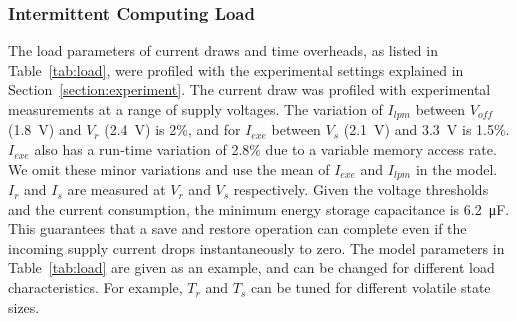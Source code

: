 
\subsubsection{Intermittent Computing Load} \label{ssubsec:loadconfig}

The load parameters of current draws and time overheads, as listed in Table~\ref{tab:load}, were profiled with the experimental settings explained in Section~\ref{section:experiment}. 
The current draw was profiled with experimental measurements at a range of supply voltages. The variation of $I_{lpm}$ between $V_{off}$ (\SI{1.8}{\volt}) and $V_{r}$ (\SI{2.4}{\volt}) is 2\%, and for $I_{exe}$ between $V_{s}$ (\SI{2.1}{\volt}) and \SI{3.3}{\volt} is 1.5\%. $I_{exe}$ also has a run-time variation of 2.8\% due to a variable memory access rate. We omit these minor variations and use the mean of $I_{exe}$ and $I_{lpm}$ in the model. $I_{r}$ and $I_{s}$ are measured at $V_{r}$ and $V_{s}$ respectively. Given the voltage thresholds and the current consumption, the minimum energy storage capacitance is \SI{6.2}{\micro\farad}. This guarantees that a save and restore operation can complete even if the incoming supply current drops instantaneously to zero. The model parameters in Table~\ref{tab:load} are given as an example, and can be changed for different load characteristics. For example, $T_{r}$ and $T_{s}$ can be tuned for different volatile state sizes.

